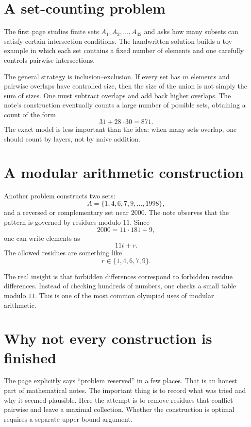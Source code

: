 
\section{A set-counting problem}

The first page studies finite sets \(A_1,A_2,\ldots,A_{32}\) and asks how many subsets can satisfy certain intersection conditions.  The handwritten solution builds a toy example in which each set contains a fixed number of elements and one carefully controls pairwise intersections.

The general strategy is inclusion--exclusion.  If every set has \(m\) elements and pairwise overlaps have controlled size, then the size of the union is not simply the sum of sizes.  One must subtract overlaps and add back higher overlaps.  The note's construction eventually counts a large number of possible sets, obtaining a count of the form
\[
  31+28\cdot30=871.
\]
The exact model is less important than the idea: when many sets overlap, one should count by layers, not by naive addition.

\section{A modular arithmetic construction}

Another problem constructs two sets:
\[
  A=\{1,4,6,7,9,\ldots,1998\},
\]
and a reversed or complementary set near \(2000\).  The note observes that the pattern is governed by residues modulo \(11\).  Since
\[
  2000=11\cdot181+9,
\]
one can write elements as
\[
  11t+r.
\]
The allowed residues are something like
\[
  r\in\{1,4,6,7,9\}.
\]

The real insight is that forbidden differences correspond to forbidden residue differences.  Instead of checking hundreds of numbers, one checks a small table modulo \(11\).  This is one of the most common olympiad uses of modular arithmetic.

\section{Why not every construction is finished}

The page explicitly says ``problem reserved'' in a few places.  That is an honest part of mathematical notes.  The important thing is to record what was tried and why it seemed plausible.  Here the attempt is to remove residues that conflict pairwise and leave a maximal collection.  Whether the construction is optimal requires a separate upper-bound argument.

